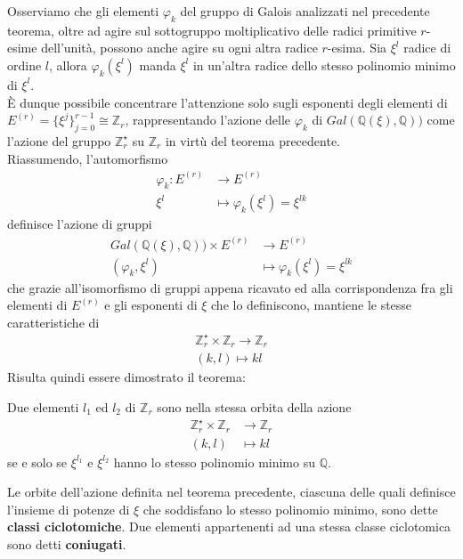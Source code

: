 Osserviamo che gli elementi $\varphi_{k}$ del gruppo di Galois analizzati nel precedente teorema, oltre ad agire sul sottogruppo moltiplicativo delle radici primitive $r$-esime dell'unità, possono anche agire su ogni altra radice $r$-esima. Sia $\xi^{l}$ radice di ordine $l$, allora $\varphi_{k}(\xi^{l})$ manda $\xi^{l}$ in un'altra radice dello stesso polinomio minimo di $\xi^{l}$.\\
È dunque possibile concentrare l'attenzione solo sugli esponenti degli elementi di $E^{(r)} = \lbrace \xi^{j}\rbrace_{j=0}^{r-1} \cong \mathbb{Z}_{r}$, rappresentando l'azione delle $\varphi_{k}$ di $Gal(\mathbb{Q}(\xi), \mathbb{Q}))$ come l'azione del gruppo $\mathbb{Z}_{r}^{\star}$ su $\mathbb{Z}_{r}$ in virtù del teorema precedente.\\
Riassumendo, l'automorfismo
\begin{align*}
\varphi_{k}: E^{(r)}  &\longrightarrow  E^{(r)}   \\
               \xi^{l} &\longmapsto \varphi_{k}(\xi^{l}) = \xi^{lk}
\end{align*}
definisce l'azione di gruppi
\begin{align*}
 Gal(\mathbb{Q}(\xi), \mathbb{Q})) \times E^{(r)}  &\longrightarrow  E^{(r)}   \\
           (\varphi_{k},\xi^{l}) &\longmapsto \varphi_{k}(\xi^{l}) = \xi^{lk}
\end{align*}
che grazie all'isomorfismo di gruppi appena ricavato ed alla corrispondenza fra gli elementi di $E^{(r)}$ e gli esponenti di $\xi$ che lo definiscono, mantiene le stesse caratteristiche di
\begin{align*}
 \mathbb{Z}_{r}^{\star} \times \mathbb{Z}_{r} \longrightarrow  \mathbb{Z}_{r}   \\
           (k,l) \longmapsto kl
\end{align*}
Risulta quindi essere dimostrato il teorema:
\begin{teorema} \label{teo:iffPoliMinimoQ}
Due elementi $l_{1}$ ed $l_{2}$ di $\mathbb{Z}_{r}$ sono nella stessa orbita della azione
\begin{align*}
 \mathbb{Z}_{r}^{\star} \times \mathbb{Z}_{r} &\longrightarrow  \mathbb{Z}_{r}   \\
           (k,l) &\longmapsto kl
\end{align*}
se e solo se $\xi^{l_{1}}$ e $\xi^{l_{2}}$ hanno lo stesso polinomio minimo su $\mathbb{Q}$.
\end{teorema}

\begin{definizione}\label{cap2:orbiteq}
   Le orbite dell'azione definita nel teorema precedente, ciascuna delle quali definisce l'insieme di potenze di $\xi$ che soddisfano lo stesso polinomio minimo, sono dette {\bf classi ciclotomiche}. Due elementi appartenenti ad una stessa classe ciclotomica sono detti {\bf coniugati}.
\end{definizione}

